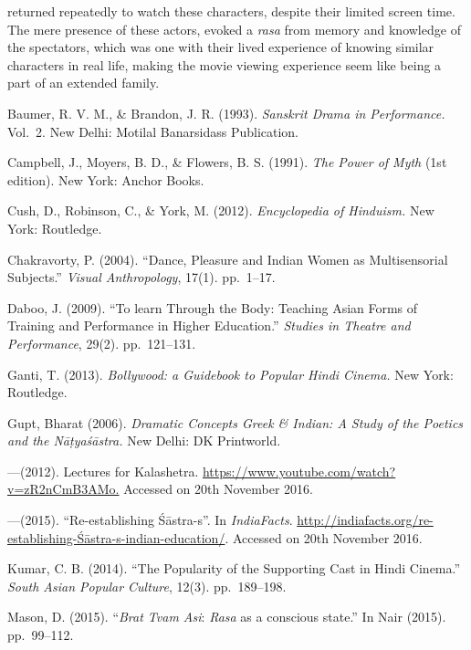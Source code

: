 returned repeatedly to watch these characters, despite their limited screen time. The mere presence of these actors, evoked a \textsl{rasa} from memory and knowledge of the spectators, which was one with their lived experience of knowing similar characters in real life, making the movie viewing experience seem like being a part of an extended family.

\begin{thebibliography}{99}
\itemsep=2pt
Baumer, R. V. M., \& Brandon, J. R. (1993). \textsl{Sanskrit Drama in Performance.} Vol.~2. New Delhi: Motilal Banarsidass Publication. 

Campbell, J., Moyers, B. D., \& Flowers, B. S. (1991). \textsl{The Power of Myth} (1st edition). New York: Anchor Books.

Cush, D., Robinson, C., \& York, M. (2012). \textsl{Encyclopedia of Hinduism.} New York: Routledge.

Chakravorty, P. (2004). “Dance, Pleasure and Indian Women as Multisensorial Subjects.” \textsl{Visual Anthropology}, 17(1). pp.~1--17. 

Daboo, J. (2009). “To learn Through the Body: Teaching Asian Forms of Training and Performance in Higher Education.” \textsl{Studies in Theatre and Performance}, 29(2). pp.~121--131.

Ganti, T. (2013). \textsl{Bollywood: a Guidebook to Popular Hindi Cinema.} New York: Routledge. 

Gupt, Bharat (2006). \textsl{Dramatic Concepts Greek \& Indian: A Study of the Poetics and the Nāṭyaśāstra.} New Delhi: DK Printworld.

---\kern3pt(2012). Lectures for Kalashetra. \url{https://www.youtube.com/watch?v=zR2nCmB3AMo.} Accessed on 20th November 2016.

---\kern3pt(2015). “Re-establishing Śāstra-s”. In \textsl{IndiaFacts}. \url{http://indiafacts.org/re-establishing-Śāstra-s-indian-education/}. Accessed on 20th November 2016.

Kumar, C. B. (2014). “The Popularity of the Supporting Cast in Hindi Cinema.” \textsl{South Asian Popular Culture}, 12(3). pp.~189--198.

Mason, D. (2015). “\textsl{Brat Tvam Asi}: \textsl{Rasa} as a conscious state.” In Nair (2015). pp.~99--112.


\end{thebibliography}
